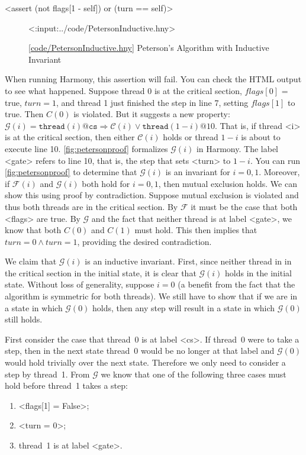 \documentclass{report}
\newcommand{\harmonylink}[1]{%
[\href{https://harmony.cs.cornell.edu/#1}{\underline{#1}}]%
}
\newenvironment{code}{
\tcolorbox
}{
\endtcolorbox
}
\begin{document}
\begin{code}
<{assert (not flags[1 - self]) or (turn == self)}>
\end{code}

\begin{figure}
\begin{code}
<{:input:../code/PetersonInductive.hny}>
\end{code}
\caption{\harmonylink{code/PetersonInductive.hny} Peterson's Algorithm with Inductive Invariant}
\label{fig:petersonproof}
\end{figure}

When running Harmony, this assertion will fail.
You can check the HTML output to see what happened.
Suppose thread 0 is at the critical section, $\mathit{flags}[0]$ = true,
$\mathit{turn} = 1$, and thread 1 just finished the step in line 7,
setting $\mathit{flags}[1]$ to true.  Then $C(0)$ is violated.
But it suggests a new property:
$\mathcal{G}(i) =
\mathtt{thread}(i)@\mathtt{cs} \Rightarrow \mathcal{C}(i) \lor \mathtt{thread}(1-i)@10$.
That is, if thread <{i}> is at the critical section, then
either $\mathcal{C}(i)$ holds or thread $1-i$ is about to execute line 10.
\autoref{fig:petersonproof} formalizes $\mathcal{G}(i)$ in Harmony.
The label <{gate}> refers to line 10, that is,
the step that sets <{turn}> to $1-i$.
You can run \autoref{fig:petersonproof} to determine
that $\mathcal{G}(i)$ is an invariant for $i = 0, 1$.
Moreover, if $\mathcal{F}(i)$ and $\mathcal{G}(i)$ both hold for $i = 0, 1$,
then mutual exclusion holds.  We can show this using proof by
contradiction.  Suppose mutual exclusion is violated and thus both threads are in
the critical section.  By $\mathcal{F}$ it must be the case that both
<{flags}> are true.  By $\mathcal{G}$ and the fact that neither thread
is at label <{gate}>, we know that both $C(0)$ and $C(1)$ must hold.
This then implies that $\mathit{turn} = 0 \land \mathit{turn} = 1$, providing
the desired contradiction.

We claim that $\mathcal{G}(i)$ is an inductive invariant.
First, since neither thread in in the critical section in the initial state,
it is clear that $\mathcal{G}(i)$ holds in the initial state.
Without loss of generality, suppose $i=0$ (a benefit from the fact that the algorithm is
symmetric for both threads).  We still have to show that if we are in a state
in which $\mathcal{G}(0)$ holds, then any step will result in a
state in which $\mathcal{G}(0)$ still holds.

First consider the case that thread~0 is at label <{cs}>.  If thread~0
were to take a step, then in the next state thread~0 would be no longer
at that label and $\mathcal{G}(0)$ would hold trivially over the next state.
Therefore we only need to consider a step by thread~1.
%
From $\mathcal{G}$ we know that one of the following three cases must hold before
thread~1 takes a step:
\begin{enumerate}
\item <{flags[1] = False}>;
\item <{turn = 0}>;
\item thread~1 is at label <{gate}>.
\end{enumerate}
\end{document}
